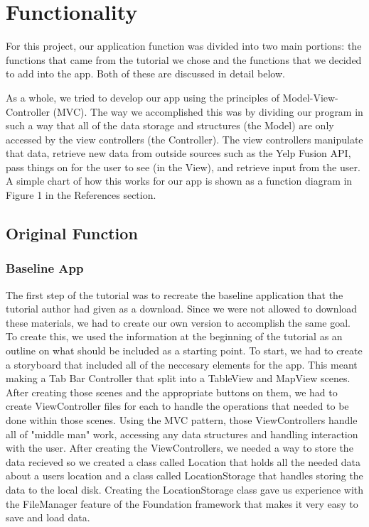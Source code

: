 \documentclass[conference]{IEEEtran}
\begin{document}
\section{Functionality}
For this project, our application function was divided into two main portions:
the functions that came from the tutorial we chose and the functions that we decided
to add into the app. Both of these are discussed in detail below.

As a whole, we tried to develop our app using the principles of Model-View-Controller 
(MVC). The way we accomplished this was by dividing our program in such a way that 
all of the data storage and structures (the Model) are only accessed by the view
controllers (the Controller). The view controllers manipulate that data, 
retrieve new data from outside sources such as the Yelp Fusion API, pass things on
for the user to see (in the View), and retrieve input from the user. A simple
chart of how this works for our app is shown as a function diagram in Figure 1
in the References section.

\subsection{Original Function}

\subsubsection{Baseline App}
The first step of the tutorial was to recreate the baseline application that the
tutorial author had given as a download. Since we were not allowed to download
these materials, we had to create our own version to accomplish the same goal.
To create this, we used the information at the beginning of the tutorial as an
outline on what should be included as a starting point. To start, we had to create
a storyboard that included all of the neccesary elements for the app. This meant 
making a Tab Bar Controller that split into a TableView and MapView scenes. After 
creating those scenes and the appropriate buttons on them, we had to create 
ViewController files for each to handle the operations that needed to be done within
those scenes. Using the MVC pattern, those ViewControllers handle all of "middle man"
work, accessing any data structures and handling interaction with the user. After
creating the ViewControllers, we needed a way to store the data recieved so we created
a class called Location that holds all the needed data about a users location and
a class called LocationStorage that handles storing the data to the local disk.
Creating the LocationStorage class gave us experience with the FileManager feature
of the Foundation framework that makes it very easy to save and load data.
\end{document}
